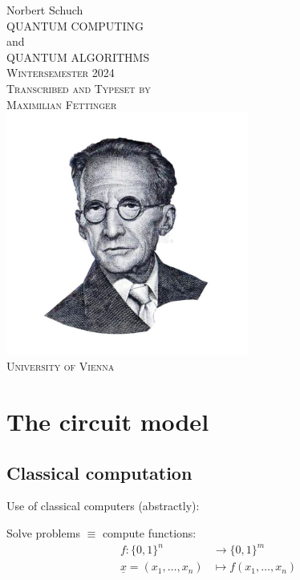 \documentclass[a4paper, 12pt]{article}
\theoremstyle{plain}
\theoremstyle{definition}
\theoremstyle{remark}
\begin{document}
\begin{titlepage}
  \centering
  \vspace*{0.06\textheight}
  {\large Norbert Schuch}\\[\baselineskip]
  {\Huge QUANTUM COMPUTING}\\[\baselineskip]
  {\Large and}\\[\baselineskip]
  {\Huge QUANTUM ALGORITHMS}\\[\baselineskip]
  {\small\scshape Wintersemester 2024}\\[\baselineskip]
  {\scshape Transcribed and Typeset by}\\
  {\large\scshape Maximilian Fettinger}\\[2\baselineskip]
  {\includegraphics[width=0.6\textwidth]{image.png}}\\[\baselineskip]
  {\small\scshape University of Vienna}\par
  \vfill\null
\end{titlepage}

\section{The circuit model}
\subsection{Classical computation}
Use of classical computers (abstractly):

Solve problems $\equiv$ compute functions:
\begin{align*}
  f: \{0,1\}^n &\rightarrow \{0,1\}^m \\
  \underline{x}=(x_1,\ldots,x_n) &\mapsto f(x_1,\ldots,x_n)
\end{align*}
\end{document}
